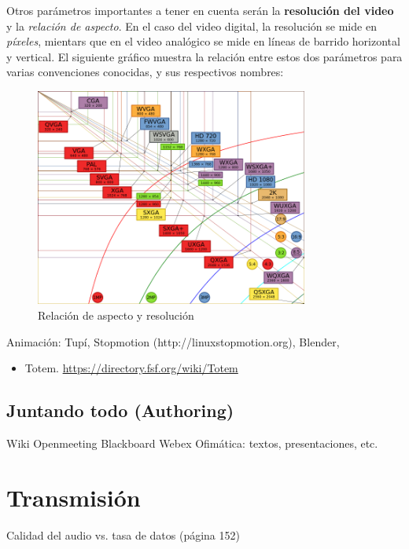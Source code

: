 \documentclass[12pt]{article}
\begin{document}
Otros parámetros importantes a tener en cuenta serán la {\bf resolución del video} y
la {\it relación de aspecto}. En el caso del video digital, la resolución 
se mide en {\it píxeles}, mientars que en el video analógico se mide en 
líneas de barrido horizontal y vertical. El siguiente gráfico muestra la relación 
entre estos dos parámetros para varias convenciones conocidas, y sus respectivos 
nombres: 


\begin{figure}[h]
\centering
\includegraphics[width=0.8\textwidth]{resol.png}
\renewcommand{\figurename}{Fig.}
\caption{Relación de aspecto y resolución}
\label{contexto:figura}
\end{figure}


Animación: Tupí, Stopmotion (http://linuxstopmotion.org), Blender, 

\begin{itemize}
\item Totem.  \url{https://directory.fsf.org/wiki/Totem}
\end{itemize}

\subsection*{Juntando todo (Authoring)}
Wiki
Openmeeting
Blackboard
Webex
Ofimática: textos, presentaciones, etc. 

\section*{Transmisión}

Calidad del audio vs. tasa de datos (página 152)
\end{document}
